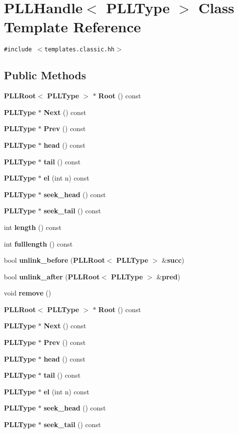 \section{PLLHandle$<$ PLLType $>$  Class Template Reference}
\label{classPLLHandle}
{\tt \#include $<$templates.classic.hh$>$}

\subsection*{Public Methods}
\begin{CompactItemize}
\item 
{\bf PLLRoot}$<$ {\bf PLLType} $>$ $\ast$ {\bf Root} () const
\item 
{\bf PLLType} $\ast$ {\bf Next} () const
\item 
{\bf PLLType} $\ast$ {\bf Prev} () const
\item 
{\bf PLLType} $\ast$ {\bf head} () const
\item 
{\bf PLLType} $\ast$ {\bf tail} () const
\item 
{\bf PLLType} $\ast$ {\bf el} (int n) const
\item 
{\bf PLLType} $\ast$ {\bf seek\_\-head} () const
\item 
{\bf PLLType} $\ast$ {\bf seek\_\-tail} () const
\item 
int {\bf length} () const
\item 
int {\bf fulllength} () const
\item 
bool {\bf unlink\_\-before} ({\bf PLLRoot}$<$ {\bf PLLType} $>$ \&{\bf succ})
\item 
bool {\bf unlink\_\-after} ({\bf PLLRoot}$<$ {\bf PLLType} $>$ \&{\bf pred})
\item 
void {\bf remove} ()
\item 
{\bf PLLRoot}$<$ {\bf PLLType} $>$ $\ast$ {\bf Root} () const
\item 
{\bf PLLType} $\ast$ {\bf Next} () const
\item 
{\bf PLLType} $\ast$ {\bf Prev} () const
\item 
{\bf PLLType} $\ast$ {\bf head} () const
\item 
{\bf PLLType} $\ast$ {\bf tail} () const
\item 
{\bf PLLType} $\ast$ {\bf el} (int n) const
\item 
{\bf PLLType} $\ast$ {\bf seek\_\-head} () const
\item 
{\bf PLLType} $\ast$ {\bf seek\_\-tail} () const
\item 

\end{CompactItemize}
